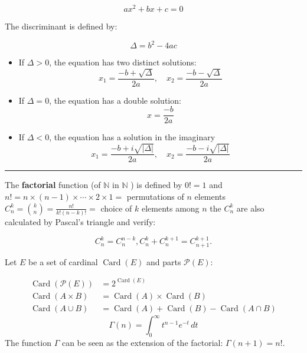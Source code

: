\begin{f}  
     \[
    ax^2 + bx + c = 0
    \]

    The discriminant is defined by:
    
    \[
    \Delta = b^2 - 4ac
    \]
       
    \begin{itemize}
        \item If \(\Delta > 0\), the equation has two distinct solutions:
        \[
        x_1 = \frac{-b + \sqrt{\Delta}}{2a}, \quad x_2 = \frac{-b - \sqrt{\Delta}}{2a}
        \]
        \item If \(\Delta = 0\), the equation has a double solution:
        \[
        x = \frac{-b}{2a}
        \]
        \item If \(\Delta < 0\), the equation has a solution in the imaginary
        \[
        x_1 = \frac{-b + i\sqrt{\lvert\Delta\rvert}}{2a}, \quad x_2 = \frac{-b - i\sqrt{\lvert\Delta\rvert}}{2a}
        \]
    \end{itemize}
\end{f}
\hrule
\begin{f}  

The \textbf{factorial} function (of \(\mathbb{N}\) in \(\mathbb{N}\) ) is defined by \(0!=1\) and \(n!=n \times(n-1) \times \cdots \times 2 \times 1=\) permutations of \(n\) elements \(\displaystyle C_n^k=\binom{k}{n}=\frac{n!}{k!(n-k)!}=\) choice of \(k\) elements among \(n\) the \(C_n^k\) are also calculated by Pascal's triangle and verify:

\[
C_n^k=C_n^{n-k}, C_n^k+C_n^{k+1}=C_{n+1}^{k+1} .
\]


Let \(E\) be a set of cardinal \(\operatorname{Card}(E)\) and parts \(\mathcal{P}(E)\):

\[
\begin{aligned}
\operatorname{Card}(\mathcal{P}(E)) & =2^{\operatorname{Card}(E)} \\
\operatorname{Card}(A \times B) & =\operatorname{Card}(A) \times \operatorname{Card}(B) \\
\operatorname{Card}(A \cup B) & =\operatorname{Card}(A)+\operatorname{Card}(B)-\operatorname{Card}(A \cap B)
\end{aligned}
\]
\[ \Gamma(n) = \int_0^\infty t^{n-1} e^{-t} \, dt \]
The function \(\Gamma\) can be seen as the extension of the factorial: \(\Gamma(n+1)=n!\).
\end{f}

